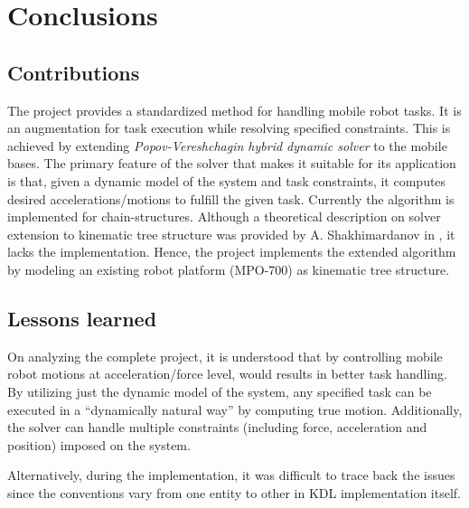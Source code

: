 
\chapter{Conclusions}

\section{Contributions}

The project provides a standardized method for handling mobile robot tasks. It is an augmentation for task execution while resolving specified constraints. This is achieved by extending \textit{Popov-Vereshchagin hybrid dynamic solver} to the mobile bases. The primary feature of the solver that makes it suitable for its application is that, given a dynamic model of the system and task constraints, it computes desired accelerations/motions to fulfill the given task. Currently the algorithm is implemented for chain-structures. Although a theoretical description on solver extension to kinematic tree structure was provided by A. Shakhimardanov in \cite{shakhimardanov2015composable}, it lacks the implementation. Hence, the project implements the extended algorithm by modeling an existing robot platform (MPO-700) as kinematic tree structure. 


\section{Lessons learned}

On analyzing the complete project, it is understood that by controlling mobile robot motions at acceleration/force level, would results in better task handling. By utilizing just the dynamic model of the system, any specified task can be executed in a ``dynamically natural way'' by computing true motion. Additionally, the solver can handle multiple constraints (including force, acceleration and position) imposed on the system. 

Alternatively, during the implementation, it was difficult to trace back the issues since the conventions vary from one entity to other in KDL implementation itself. 


